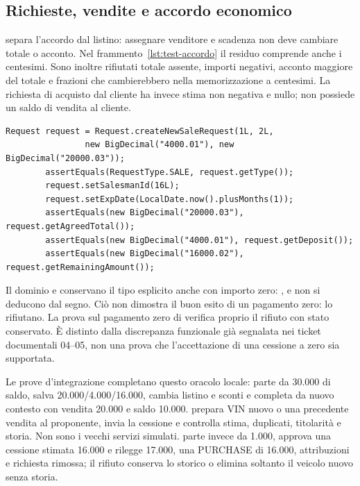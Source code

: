 \subsection{Richieste, vendite e accordo economico}\label{sec:test-vendite}
 separa l'accordo dal listino: assegnare
venditore e scadenza non deve cambiare totale o acconto. Nel
frammento~\ref{lst:test-accordo} il residuo comprende anche i centesimi.
Sono inoltre rifiutati totale assente, importi negativi, acconto maggiore
del totale e frazioni che cambierebbero nella memorizzazione a centesimi.
La richiesta di acquisto dal cliente ha invece stima non negativa e
 nullo; non possiede un saldo di vendita al cliente.

\noindent\begin{minipage}{\linewidth}
\begin{lstlisting}[firstnumber=17,caption={\code{RequestAgreementTest.java}: estratto della prova.},label=lst:test-accordo]
        Request request = Request.createNewSaleRequest(1L, 2L,
                new BigDecimal("4000.01"), new BigDecimal("20000.03"));
        assertEquals(RequestType.SALE, request.getType());
        request.setSalesmanId(16L);
        request.setExpDate(LocalDate.now().plusMonths(1));
        assertEquals(new BigDecimal("20000.03"), request.getAgreedTotal());
        assertEquals(new BigDecimal("4000.01"), request.getDeposit());
        assertEquals(new BigDecimal("16000.02"), request.getRemainingAmount());
\end{lstlisting}
\end{minipage}

Il dominio e  conservano il tipo esplicito anche con
importo zero: ,  e  non si deducono
dal segno. Ciò non dimostra il buon esito di un pagamento zero:
 lo rifiutano.
La prova sul pagamento zero di 
verifica proprio il rifiuto con stato conservato. È distinto dalla discrepanza
funzionale già segnalata nei ticket documentali 04--05, non una prova che
l'accettazione di una cessione a zero sia supportata.

Le prove d'integrazione completano questo oracolo locale:
 parte da 30.000 di saldo, salva
20.000/4.000/16.000, cambia listino e sconti e completa da nuovo contesto
con vendita 20.000 e saldo 10.000. 
prepara VIN nuovo o una precedente vendita al proponente, invia la cessione
e controlla stima, duplicati, titolarità e storia. Non sono i vecchi servizi
simulati.  parte invece da 1.000,
approva una cessione stimata 16.000 e rilegge 17.000, una PURCHASE di
16.000, attribuzioni e richiesta rimossa; il rifiuto conserva lo storico
o elimina soltanto il veicolo nuovo senza storia.

